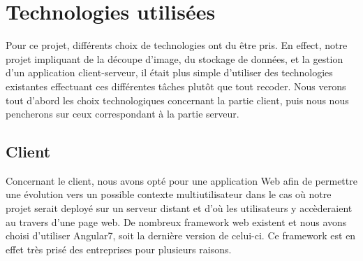 \chapter{Technologies utilisées}

Pour ce projet, différents choix de technologies ont du être pris. En effect, notre projet impliquant de la découpe d'image, du stockage de données, et la gestion d'un application client-serveur, il était plus simple d'utiliser des technologies existantes effectuant ces différentes tâches plutôt que tout recoder.
Nous verons tout d'abord les choix technologiques concernant la partie client, puis nous nous pencherons sur ceux correspondant à la partie serveur.

\section{Client}

Concernant le client, nous avons opté pour une application Web afin de permettre une évolution vers un possible contexte multiutilisateur dans le cas où notre projet serait deployé sur un serveur distant et d'où les utilisateurs y accèderaient au travers d'une page web. De nombreux framework web existent et nous avons choisi d'utiliser Angular7, soit la dernière version de celui-ci. Ce framework est en effet très prisé des entreprises pour plusieurs raisons.